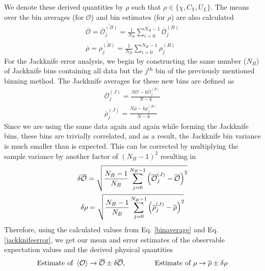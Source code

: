 \documentclass[../journal_main.tex]{subfiles}
\begin{document}
We denote these derived quantities by $\rho $ such that $\rho \in \{\chi , C_V, U_L\}$. The means over the bin averages (for $\mathcal{O}$) and bin estimates (for $\rho $) are also calculated
\begin{subequations}
    \begin{gather}
        \overline{\mathcal{O}} = \overline{\overline{\mathcal{O}}^{(B)}_j} = \frac{1}{N_B} \sum_{i=0}^{N_B-1} \overline{\mathcal{O}}^{(B)}_j \\
        \overline{\mathcal{\rho }} = \overline{{\rho }^{(B)}_j} = \frac{1}{N_B} \sum_{i=0}^{N_B-1} {\rho }^{(B)}_j
    \end{gather}       
    \label{binaverage} 
\end{subequations}
\!\!\!For the Jackknife error analysis, we begin by constructing the same number ($N_B$) of Jackknife bins containing all data but the $j^\text{th}$ bin of the previously mentioned binning method. The Jackknife averages for these new bins are defined as 
\begin{gather}
    \overline{\mathcal{O}}^{(J)}_j = \frac{N\overline{\mathcal{O}} - k \overline{\mathcal{O}}^{(B)}_j}{N - k} \\
    \overline{\rho }^{(J)}_j = \frac{N\overline{\rho } - k {\rho}^{(B)}_j}{N - k}
\end{gather}          
Since we are using the same data again and again while forming the Jackknife bins, these bins are trivially correlated, and as a result, the Jackknife bin variance is much smaller than is expected. This can be corrected by multiplying the sample variance by another factor of $(N_B-1)^2$ resulting in 
\begin{subequations}
    \begin{gather}
        \delta \overline{\mathcal{O}} = \sqrt{\frac{N_B-1}{N_B} \sum_{j=0}^{N_B-1}\qty(\overline{\mathcal{O}}^{(J)}_j - \overline{\mathcal{O}})^2} \\
        \delta \rho  = \sqrt{\frac{N_B-1}{N_B} \sum_{j=0}^{N_B-1}\qty(\overline{\rho }^{(J)}_j - \overline{\rho})^2}
    \end{gather}     
    \label{jackknifeerror}
\end{subequations}
\!\!\!Therefore, using the calculated values from Eq. \eqref{binaverage} and Eq. \eqref{jackknifeerror}, we get our mean and error estimates of the observable expectation values and the derived physical quantities
\[
    \text{Estimate of }\expval{\mathcal{O}} \rightarrow \overline{\mathcal{O}} \pm \delta \overline{\mathcal{O}}, \qquad\qquad \text{Estimate of }{\rho } \rightarrow \overline{\rho } \pm \delta {\rho } 
\]
\end{document}
